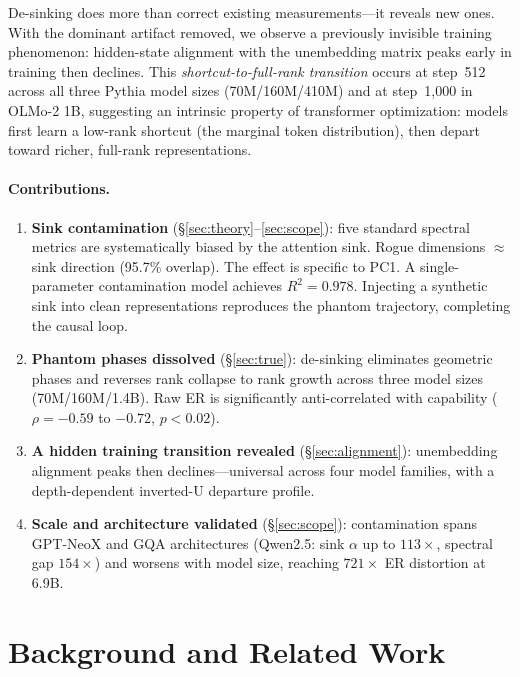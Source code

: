 \documentclass[11pt]{article}
\begin{document}
De-sinking does more than correct existing measurements---it reveals new ones.
With the dominant artifact removed, we observe a previously invisible training phenomenon: hidden-state alignment with the unembedding matrix peaks early in training then declines.
This \emph{shortcut-to-full-rank transition} occurs at step~512 across all three Pythia model sizes (70M/160M/410M) and at step~1{,}000 in OLMo-2 1B, suggesting an intrinsic property of transformer optimization: models first learn a low-rank shortcut (the marginal token distribution), then depart toward richer, full-rank representations.

\paragraph{Contributions.}
\begin{enumerate}[leftmargin=1.5em,itemsep=0pt,topsep=1pt]
    \item \textbf{Sink contamination} (\S\ref{sec:theory}--\ref{sec:scope}): five standard spectral metrics are systematically biased by the attention sink. Rogue dimensions $\approx$ sink direction (95.7\% overlap). The effect is specific to PC1. A single-parameter contamination model achieves $R^2 = 0.978$. Injecting a synthetic sink into clean representations reproduces the phantom trajectory, completing the causal loop.
    \item \textbf{Phantom phases dissolved} (\S\ref{sec:true}): de-sinking eliminates geometric phases and reverses rank collapse to rank growth across three model sizes (70M/160M/1.4B). Raw ER is significantly anti-correlated with capability ($\rho = -0.59$ to $-0.72$, $p < 0.02$).
    \item \textbf{A hidden training transition revealed} (\S\ref{sec:alignment}): unembedding alignment peaks then declines---universal across four model families, with a depth-dependent inverted-U departure profile.
    \item \textbf{Scale and architecture validated} (\S\ref{sec:scope}): contamination spans GPT-NeoX and GQA architectures (Qwen2.5: sink $\alpha$ up to $113\times$, spectral gap $154\times$) and worsens with model size, reaching $721\times$ ER distortion at 6.9B.
\end{enumerate}

\section{Background and Related Work}\label{sec:related}
\end{document}
